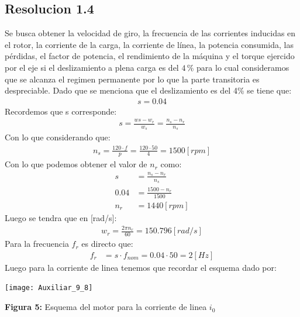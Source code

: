 \documentclass[
  11pt,
  letterpaper,
   addpoints,
   answers
  ]{exam}
\begin{document}
\begin{questions}
\begin{solution}
        \subsection*{Resolucion 1.4}
        Se busca obtener la velocidad de giro, la frecuencia de las corrientes inducidas en el rotor, la corriente de la carga, la corriente de línea, la potencia consumida, las pérdidas, el factor de potencia, el rendimiento de la máquina y el torque ejercido por el eje si el deslizamiento a plena carga es del \(4 \, \%\) para lo cual consideramos que se alcanza el regimen permanente por lo que la parte transitoria es despreciable. Dado que se menciona que el deslizamiento es del 4\% se tiene que:
        \begin{align}
            s = 0.04 
        \end{align}
        Recordemos que s corresponde:
        \begin{align}
            s= \frac{w{s} - w_{r}}{w_{s}} = \frac{n_{s}- n_{r}}{n_{s}}
        \end{align}
        Con lo que considerando que:
        \begin{align}
            n_{s} = \frac{120 \cdot f}{p} = \frac{120 \cdot 50}{4} = 1500[rpm]
        \end{align}
        Con lo que podemos obtener el valor de $n_{r}$ como:
        \begin{align}
            s&= \frac{n_{s} - n_{r}}{n_{s}}\\
            0.04 &= \frac{1500 - n_{r}}{1500}\\
            n_{r} &= 1440[rpm]
        \end{align}
        Luego se tendra que en [rad/s]:
        \begin{align}
            w_{r} = \frac{2\pi n_{r}}{60} = 150.796[rad/s]
        \end{align}
        Para la frecuencia $f_{r}$ es directo que:
        \begin{align}
            f_{r} &= s \cdot f_{nom} = 0.04 \cdot 50 = 2[Hz]
        \end{align}
        Luego para la corriente de linea tenemos que recordar el esquema dado por:
        \begin{center}
            \texttt{[image: Auxiliar\_9\_8]}
        \end{center}
        \begin{center}
            \textbf{Figura 5:} Esquema del motor para la corriente de linea $i_{0}$
        \end{center}

\end{solution}
\end{questions}
\end{document}
